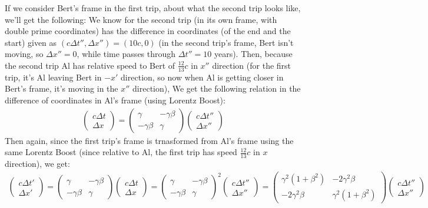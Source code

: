 \documentclass{article}
\begin{document}
If we consider Bert's frame in the first trip, about what the second trip looks like, we'll get the following: We know for the second trip (in its own frame, with double prime coordinates) has the difference in coordinates (of the end and the start) given as $(c\Delta t'', \Delta x'') =   (10c, 0)$ (in the second trip's frame, Bert isn't moving, so $\Delta x'' = 0$, while time passes through $\Delta t''=10$ years). Then, because the second trip Al has relative speed to Bert of $\frac{12}{13}c$ in $x''$ direction (for the first trip, it's Al leaving Bert in $-x'$ direction, so now when Al is getting closer in Bert's frame, it's moving in the $x''$ direction), We get the following relation in the difference of coordinates in Al's frame (using Lorentz Boost):
\begin{align}
    \begin{pmatrix}
        c\Delta t\\\Delta x
    \end{pmatrix} = \begin{pmatrix}
        \gamma & -\gamma\beta\\
        -\gamma\beta & \gamma
    \end{pmatrix}\begin{pmatrix}
        c\Delta t''\\\Delta x''
    \end{pmatrix}
\end{align}
Then again, since the first trip's frame is trnasformed from Al's frame using the same Lorentz Boost (since relative to Al, the first trip has speed $\frac{12}{13}c$ in $x$ direction), we get:
\begin{align}
    \begin{pmatrix}
        c\Delta t'\\\Delta x'
    \end{pmatrix} = \begin{pmatrix}
        \gamma & -\gamma\beta\\
        -\gamma\beta & \gamma
    \end{pmatrix}\begin{pmatrix}
        c\Delta t\\\Delta x
    \end{pmatrix} = \begin{pmatrix}
        \gamma & -\gamma\beta\\
        -\gamma\beta & \gamma
    \end{pmatrix}^2 \begin{pmatrix}
        c\Delta t''\\\Delta x''
    \end{pmatrix} = \begin{pmatrix}
        \gamma^2(1+\beta^2) & -2\gamma^2\beta\\
        -2\gamma^2\beta & \gamma^2(1+\beta^2)
    \end{pmatrix}\begin{pmatrix}
        c\Delta t''\\\Delta x''
    \end{pmatrix}
\end{align}
\end{document}
